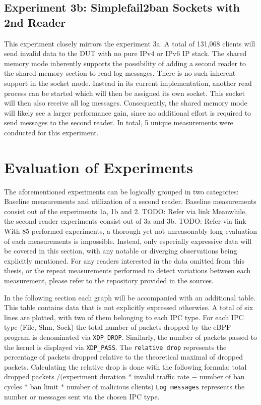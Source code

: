 \subsection{Experiment 3b: Simplefail2ban Sockets with 2nd Reader}
This experiment closely mirrors the experiment 3a.
A total of 131,068 clients will send invalid data to the DUT with no pure IPv4 or IPv6 IP stack.
The shared memory mode inherently supports the possibility of adding a second reader to the shared memory section to read log messages.
There is no such inherent support in the socket mode.
Instead in its current implementation, another read process can be started which will then be assigned its own socket.
This socket will then also receive all log messages.
Consequently, the shared memory mode will likely see a larger performance gain, since no additional effort is required to send messages to the second reader. 
In total, 5 unique measurements were conducted for this experiment.

\newpage
\section{Evaluation of Experiments}
The aforementioned experiments can be logically grouped in two categories\@: Baseline measurements and utilization of a second reader.
Baseline measurements consist out of the experiments 1a, 1b and 2. TODO: Refer via link
Meanwhile, the second reader experiments consist out of 3a and 3b. TODO: Refer via link
With 85 performed experiments, a thorough yet not unreasonably long evaluation of each measurements is impossible.
Instead, only especially expressive data will be covered in this section, with any notable or diverging observations being explicitly mentioned.
For any readers interested in the data omitted from this thesis, or the repeat measurements performed to detect variations between each measurement, please refer to the repository provided in the sources\cite{git:repoOfThesis}.

In the following section each graph will be accompanied with an additional table.
This table contains data that is not explicitly expressed otherwise.
A total of six lines are plotted, with two of them belonging to each IPC type.
For each IPC type (File, Shm, Sock) the total number of packets dropped by the eBPF program is denominated via \texttt{XDP\_DROP}.
Similarly, the number of packets passed to the kernel is displayed via \texttt{XDP\_PASS}.
The \texttt{relative drop} represents the percentage of packets dropped relative to the theoretical maximal of dropped packets.
Calculating the relative drop is done with the following formula:
\noindent
total dropped packets $/ ($experiment duration $*$ invalid traffic rate $-$ number of ban cycles $*$ ban limit $*$ number of malicious clients$)$
\noindent
\texttt{Log messages} represents the number or messages sent via the chosen IPC type.


